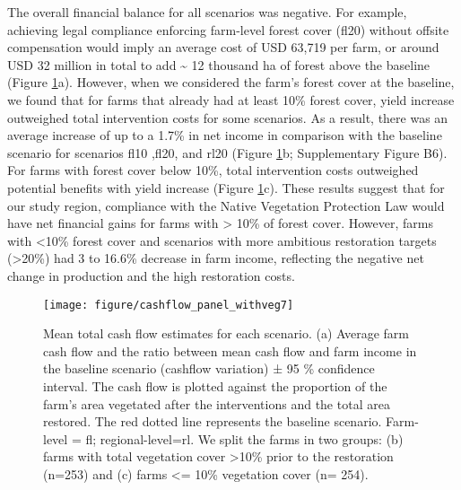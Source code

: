 \documentclass[
	12pt,				%
	oneside,			%
	a4paper,			%
	chapter=TITLE,		%
	section=TITLE,		%
	brazil,			%
	english				%
	]{abntex2}
\begin{document}
The overall financial balance for all scenarios was negative. For example, achieving legal compliance enforcing farm-level forest cover (fl20) without offsite compensation would imply an average cost of USD 63,719 per farm, or around USD 32 million in total to add \textasciitilde{} 12 thousand ha of forest above the baseline (Figure \ref{fig:fig4}a). However, when we considered the farm's forest cover at the baseline, we found that for farms that already had at least 10\% forest cover, yield increase outweighed total intervention costs for some scenarios. As a result, there was an average increase of up to a 1.7\% in net income in comparison with the baseline scenario for scenarios fl10 ,fl20, and rl20 (Figure \ref{fig:fig4}b; Supplementary Figure B6). For farms with forest cover below 10\%, total intervention costs outweighed potential benefits with yield increase (Figure \ref{fig:fig4}c). These results suggest that for our study region, compliance with the Native Vegetation Protection Law would have net financial gains for farms with \textgreater{} 10\% of forest cover. However, farms with \textless10\% forest cover and scenarios with more ambitious restoration targets (\textgreater20\%) had 3 to 16.6\% decrease in farm income, reflecting the negative net change in production and the high restoration costs.
\begin{figure}[H]

{\centering \texttt{[image: figure/cashflow\_panel\_withveg7]} 

}

\caption{Mean total cash flow estimates for each scenario. (a) Average farm cash flow and the ratio between mean cash flow and farm income in the baseline scenario (cashflow variation) ± 95 \% confidence interval. The cash flow is plotted against the proportion of the farm's area vegetated after the interventions and the total area restored. The red dotted line represents the baseline scenario. Farm-level = fl; regional-level=rl. We split the farms in two groups: (b) farms with total vegetation cover >10\% prior to the restoration (n=253) and (c)  farms <= 10\% vegetation cover (n= 254). }\label{fig:fig4}
\end{figure}
\end{document}
